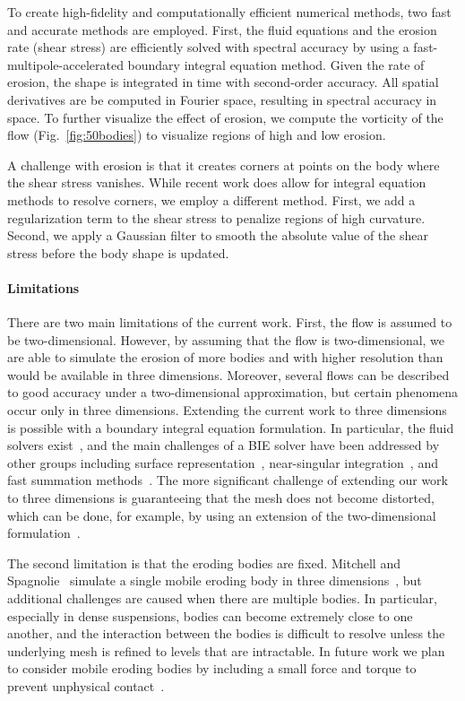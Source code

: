 \documentclass[preprint, 10pt]{elsarticle}
\begin{document}
To create high-fidelity and computationally efficient numerical methods,
two fast and accurate methods are employed.  First, the fluid equations
and the erosion rate (shear stress) are efficiently solved with spectral
accuracy by using a fast-multipole-accelerated boundary integral
equation method.  Given the rate of erosion, the shape is integrated in
time with second-order accuracy.  All spatial derivatives are be
computed in Fourier space, resulting in spectral accuracy in space.
To further visualize the effect of erosion, we compute the
vorticity of the flow (Fig.~\ref{fig:50bodies}) to visualize regions
of high and low erosion.

A challenge with erosion is that it creates corners at points on the
body where the shear stress vanishes.  While recent work does allow for
integral equation methods to resolve corners, we employ a different
method.  First, we add a regularization term to the shear stress to
penalize regions of high curvature.  Second, we apply a Gaussian filter
to smooth the absolute value of the shear stress before the body shape
is updated.

\paragraph{Limitations} There are two main limitations of the current
work.  First, the flow is assumed to be two-dimensional.  However, by
assuming that the flow is two-dimensional, we are able to simulate the
erosion of more bodies and with higher resolution than would be
available in three dimensions.  Moreover, several flows can be described
to good accuracy under a two-dimensional approximation, but certain
phenomena occur only in three dimensions.  Extending the current work to
three dimensions is possible with a boundary integral equation
formulation.  In particular, the fluid solvers exist~\cite{mal-bir2015},
and the main challenges of a BIE solver have been addressed by other
groups including surface representation~\cite{yin-bir-zor2006,
vee-rah-bir-zor2011}, near-singular integration~\cite{yin-bir-zor2006,
kli-tor2016b}, and fast summation methods~\cite{yin-bir-zor2004,
ros-ols2015}.  The more significant challenge of extending our work to
three dimensions is guaranteeing that the mesh does not become
distorted, which can be done, for example, by using an extension of the
two-dimensional {\thL} formulation~\cite{amb-sie-tlu2013}.

The second limitation is that the eroding bodies are fixed.  Mitchell
and Spagnolie~\cite{mit-spa2016} simulate a single mobile eroding body
in three dimensions~\cite{mit-spa2016}, but additional challenges are
caused when there are multiple bodies. In particular, especially in
dense suspensions, bodies can become extremely close to one another, and
the interaction between the bodies is difficult to resolve unless the
underlying mesh is refined to levels that are intractable. In future
work we plan to consider mobile eroding bodies by including a small
force and torque to prevent unphysical contact~\cite{lu-rah-zor2017}.
\end{document}
